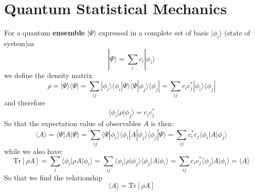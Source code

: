 \documentclass{article}
\begin{document}
\section{Quantum Statistical Mechanics}
For a quantum \textbf{ensemble} $|\Psi\rangle$ expressed in a complete set of basis $|\phi_i\rangle$ (state of system)as 
\begin{equation}
    |\Psi\rangle = \sum_i c_i |\phi_i\rangle
\end{equation}
we define the density matrix 
\begin{equation}
    \rho = |\Psi\rangle \langle \Psi | = \sum_{ij} |\phi_i\rangle \langle \phi_i| \Psi\rangle \langle \Psi |\phi_j\rangle \langle \phi_j|
    = \sum_{ij} c_i c_j^* |\phi_i\rangle \langle \phi_j| \label{density1}
\end{equation}
and therefore
\begin{equation}
    \langle \phi_i | \rho | \phi_j \rangle = c_i c_j^*
\end{equation}
So that the expectation value of observables $A$ is then:
\begin{equation}
    \langle A \rangle = \langle \Psi | A | \Psi \rangle
    = \sum_{ij} \langle \Psi |\phi_i\rangle \langle \phi_i| A | \phi_j\rangle \langle \phi_j|\Psi \rangle
    = \sum_{ij} c_i^* c_j \langle \phi_i| A | \phi_j\rangle
\end{equation}
while we also have:
\begin{equation}
    \text{Tr}[\rho A] = \sum_i \langle \phi_i | \rho A | \phi_i \rangle
        = \sum_{ij} \langle \phi_i | \rho | \phi_j \rangle \langle \phi_j | A | \phi_i \rangle
        = \sum_{ij} c_i c_j^* \langle \phi_j | A | \phi_i \rangle = \langle A \rangle
\end{equation}
So that we find the relationship
\begin{equation}
    \langle A \rangle = \text{Tr}[\rho A]
\end{equation}
\end{document}
